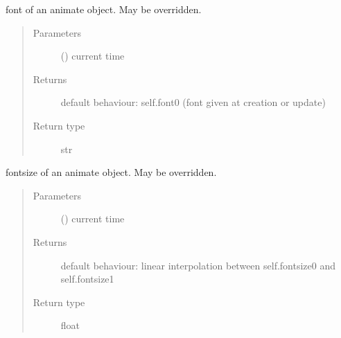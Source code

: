 \documentclass[letterpaper,10pt,english]{sphinxmanual}
\begin{document}
\begin{fulllineitems}
\begin{fulllineitems}
\end{fulllineitems}


\begin{fulllineitems}
\label{\detokenize{Reference:salabim.Animate.font}}
font of an animate object. May be overridden.
\begin{quote}\begin{description}
\item[{Parameters}] \leavevmode
{} () \textendash{} current time

\item[{Returns}] \leavevmode
{} \textendash{} default behaviour: self.font0 (font given at creation or update)

\item[{Return type}] \leavevmode
str

\end{description}\end{quote}

\end{fulllineitems}


\begin{fulllineitems}
\label{\detokenize{Reference:salabim.Animate.fontsize}}
fontsize of an animate object. May be overridden.
\begin{quote}\begin{description}
\item[{Parameters}] \leavevmode
{} () \textendash{} current time

\item[{Returns}] \leavevmode
{} \textendash{} default behaviour: linear interpolation between self.fontsize0 and self.fontsize1

\item[{Return type}] \leavevmode
float

\end{description}\end{quote}

\end{fulllineitems}


\end{fulllineitems}
\end{document}
